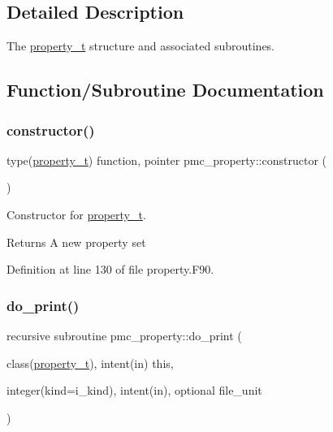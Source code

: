 \subsection{Detailed Description}
The \mbox{\hyperlink{structpmc__property_1_1property__t}{property\+\_\+t}} structure and associated subroutines. 

\subsection{Function/\+Subroutine Documentation}
\mbox{\label{namespacepmc__property_ac1691fe0d2b767ab79cb3d3e95e9ddba}} 
\subsubsection{\texorpdfstring{constructor()}{constructor()}}
{\footnotesize\ttfamily type(\mbox{\hyperlink{structpmc__property_1_1property__t}{property\+\_\+t}}) function, pointer pmc\+\_\+property\+::constructor (\begin{DoxyParamCaption}{ }\end{DoxyParamCaption})\hspace{0.3cm}{\ttfamily [private]}}



Constructor for \mbox{\hyperlink{structpmc__property_1_1property__t}{property\+\_\+t}}. 

\begin{DoxyReturn}{Returns}
A new property set 
\end{DoxyReturn}


Definition at line 130 of file property.\+F90.

\mbox{\label{namespacepmc__property_a3f735ac876b8ed0ecd03cc71febb3b66}} 
\subsubsection{\texorpdfstring{do\+\_\+print()}{do\_print()}}
{\footnotesize\ttfamily recursive subroutine pmc\+\_\+property\+::do\+\_\+print (\begin{DoxyParamCaption}\item[{class(\mbox{\hyperlink{structpmc__property_1_1property__t}{property\+\_\+t}}), intent(in)}]{this,  }\item[{integer(kind=i\+\_\+kind), intent(in), optional}]{file\+\_\+unit }\end{DoxyParamCaption})\hspace{0.3cm}{\ttfamily [private]}}



